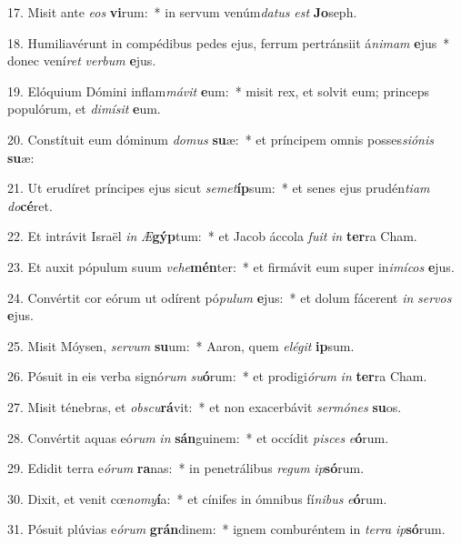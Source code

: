 17. Misit ante \textit{e}\textit{os} \textbf{vi}rum:~*  in servum venúm\textit{da}\textit{tus} \textit{est} \textbf{Jo}seph.\

18. Humiliavérunt in compédibus pedes ejus, ferrum pertránsiit á\textit{ni}\textit{mam} \textbf{e}jus~*  donec vení\textit{ret} \textit{ver}\textit{bum} \textbf{e}jus.\

19. Elóquium Dómini inflam\textit{má}\textit{vit} \textbf{e}um:~*  misit rex, et solvit eum; princeps populórum, et \textit{di}\textit{mí}\textit{sit} \textbf{e}um.\

20. Constítuit eum dóminum \textit{do}\textit{mus} \textbf{su}æ:~*  et príncipem omnis posses\textit{si}\textit{ó}\textit{nis} \textbf{su}æ:\

21. Ut erudíret príncipes ejus sicut \textit{se}\textit{met}\textbf{íp}sum:~*  et senes ejus prudén\textit{ti}\textit{am} \textit{do}\textbf{cé}ret.\

22. Et intrávit Israël \textit{in} \textit{Æ}\textbf{gýp}tum:~*  et Jacob áccola \textit{fu}\textit{it} \textit{in} \textbf{ter}ra Cham.\

23. Et auxit pópulum suum \textit{ve}\textit{he}\textbf{mén}ter:~*  et firmávit eum super in\textit{i}\textit{mí}\textit{cos} \textbf{e}jus.\

24. Convértit cor eórum ut odírent pó\textit{pu}\textit{lum} \textbf{e}jus:~*  et dolum fácerent \textit{in} \textit{ser}\textit{vos} \textbf{e}jus.\

25. Misit Móysen, \textit{ser}\textit{vum} \textbf{su}um:~*  Aaron, quem \textit{e}\textit{lé}\textit{git} \textbf{ip}sum.\

26. Pósuit in eis verba signó\textit{rum} \textit{su}\textbf{ó}rum:~*  et prodigi\textit{ó}\textit{rum} \textit{in} \textbf{ter}ra Cham.\

27. Misit ténebras, et \textit{obs}\textit{cu}\textbf{rá}vit:~*  et non exacerbávit \textit{ser}\textit{mó}\textit{nes} \textbf{su}os.\

28. Convértit aquas eó\textit{rum} \textit{in} \textbf{sán}guinem:~*  et occídit \textit{pi}\textit{sces} \textit{e}\textbf{ó}rum.\

29. Edidit terra e\textit{ó}\textit{rum} \textbf{ra}nas:~*  in penetrálibus \textit{re}\textit{gum} \textit{ip}\textbf{só}rum.\

30. Dixit, et venit cœ\textit{no}\textit{my}\textbf{í}a:~*  et cínifes in ómnibus fí\textit{ni}\textit{bus} \textit{e}\textbf{ó}rum.\

31. Pósuit plúvias e\textit{ó}\textit{rum} \textbf{grán}dinem:~*  ignem comburéntem in \textit{ter}\textit{ra} \textit{ip}\textbf{só}rum.\

